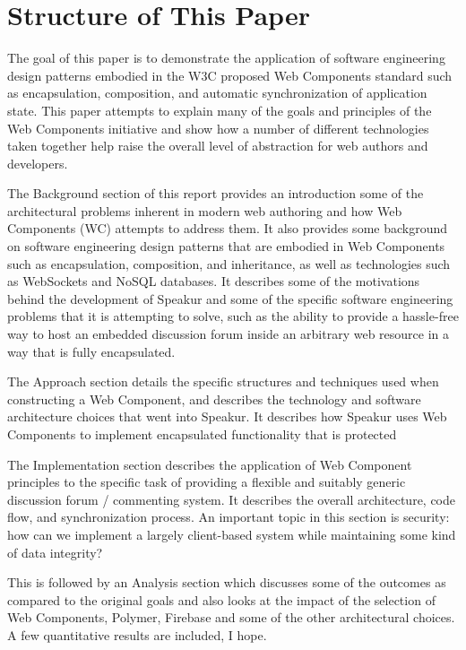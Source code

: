 \section{Structure of This Paper}
%

The goal of this paper is to demonstrate the application of software engineering design patterns embodied in the  W3C proposed Web Components standard such as encapsulation, composition, and
automatic synchronization of application state. 
This paper attempts to explain many of the goals and principles of the Web Components initiative and show how a number of different technologies taken together help raise the overall level of abstraction for web authors and developers.

The Background section of this report provides an introduction some of the architectural problems inherent in modern web authoring and how Web Components (WC) attempts to address them. 
It also provides some background on software engineering design patterns that are embodied in Web Components such as encapsulation, composition, and inheritance, as well as technologies such as WebSockets and NoSQL databases.
It describes some of the motivations behind the development of Speakur and some of the specific software engineering problems that it is attempting to solve, such as the ability to provide a hassle-free way to host an embedded discussion forum inside an arbitrary web resource in a way that is fully encapsulated.

The Approach section details the specific structures and techniques used when constructing a Web Component, and describes the technology and software architecture choices that went into Speakur. 
It describes how Speakur uses Web Components to implement encapsulated functionality that is protected 

The Implementation section describes the application of Web Component principles to the specific task of providing a flexible and suitably generic discussion forum / commenting system. 
It describes the overall architecture, code flow, and synchronization process. 
An important topic in this section is security: how can we implement a largely client-based system while maintaining some kind of data integrity?

This is followed by an Analysis section which discusses some of the outcomes as compared to the original goals and also looks at the impact of the selection of Web Components, Polymer, Firebase and some of the other architectural choices. A few quantitative results are included, I hope.

